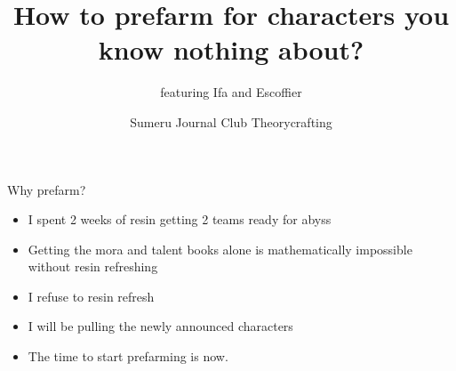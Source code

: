 \documentclass{beamer}
\title{How to prefarm for characters you know nothing about?}
\subtitle{featuring Ifa and Escoffier}
\author{Sumeru Journal Club Theorycrafting}
\begin{document}
\frame{\titlepage}
\begin{frame}{Why prefarm?} 
    \begin{itemize}
        \pause 
        \item I spent 2 weeks of resin getting 2 teams ready for abyss 
        \pause
        \item Getting the mora and talent books alone is mathematically impossible without resin refreshing
        \pause 
        \item I refuse to resin refresh 
        \pause 
        \item I will be pulling the newly announced characters
        \pause 
        \item The time to start prefarming is now. 
    \end{itemize}
    
\end{frame}
\end{document}
